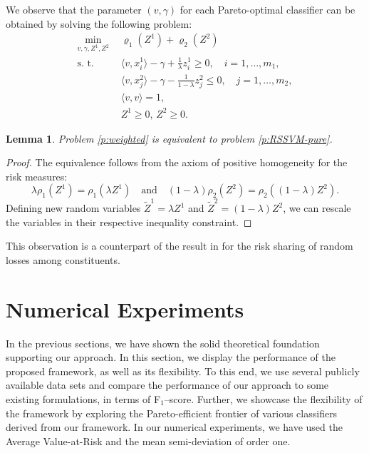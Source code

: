 \documentclass[10pt,letterpaper]{article}
\newcommand{\1}{1{\hskip -2.55 pt}\hbox{I}}
\newtheorem{proof}{Proof}
\newtheorem{lemma}[theorem]{Lemma}
\begin{document}
We observe that the parameter $(v,\gamma)$ for each Pareto-optimal classifier can be obtained by solving the following problem:
\begin{equation}
\label{p:weighted}
\begin{aligned}
\min_{v,\gamma,Z^1,Z^2}\ &\,  \varrho_1(Z^1) + \varrho_2(Z^2) \\
\text{s. t. } &\, \langle v, x^1_i\rangle - \gamma + \frac{1}{\lambda}z_i^1 \ge 0, \quad i=1,\dots,m_1,\\
&\, \langle v, x^2_{j}\rangle -\gamma  - \frac{1}{1-\lambda}z_{j}^2 \le 0, \quad j=1,\dots,m_2,\\
&\, \langle v,v\rangle =1,\\
&\, Z^1\ge 0,\, Z^2\geq 0.
\end{aligned}
\end{equation}
\begin{lemma}
Problem \eqref{p:weighted} is equivalent to problem \eqref{p:RSSVM-pure}.   
\end{lemma}
\begin{proof}
The equivalence follows from the axiom of positive homogeneity for the risk measures:
\[
\lambda \rho_1(Z^1) = \rho_1(\lambda Z^1) \quad\text{and}\quad (1-\lambda) \rho_2(Z^2) = \rho_2((1-\lambda) Z^2).
\]
Defining new random variables $\tilde{Z}^1= \lambda Z^1$ and $\tilde{Z}^2= (1-\lambda) Z^2$, we can rescale the variables in their
respective inequality constraint.  
\end{proof}
This observation is a counterpart of the result in \cite{jouini2008optimal} for the risk sharing of random losses among constituents. \\




\section{Numerical Experiments} %
\label{sec:numerical_experiments}


In the previous sections, we have shown the solid theoretical foundation supporting our approach.
In this section, we display the performance of the proposed framework, as well as its flexibility.
To this end, we use several publicly available data sets and compare the performance of our approach to some existing formulations, in terms of F$_1$--score. Further, we showcase the flexibility of the framework by exploring the Pareto-efficient frontier of various classifiers derived from our framework.
In our numerical experiments, we have used the Average Value-at-Risk and the mean semi-deviation of order one.
\end{document}

